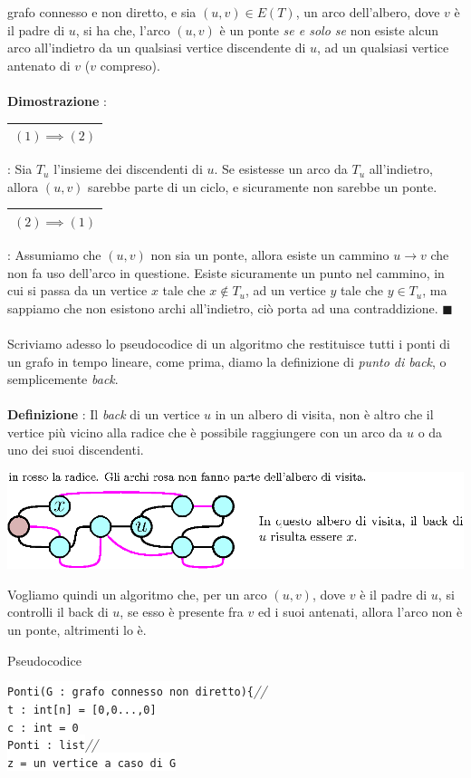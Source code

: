 \documentclass[12pt, letterpaper]{article}
\newcommand{\codee}[1]{\colorbox{white}{\texttt{#1}}}
\newcommand{\acc}{\\\hphantom{}\\}
\newcommand{\comm}[1]{\color{lg}\textit{\hphantom{spaz}// \text{#1}}\color{black}}
\newcommand{\boxedMath}[1]{\begin{tabular}{|c|}\hline \texttt{#1} \\ \hline\end{tabular} :}
\begin{document}
grafo connesso e non diretto, e sia $(u,v)\in E(T)$, un arco dell'albero, dove $v$ è il padre di $u$, si ha che,
l'arco  $(u,v)$ è un ponte \textit{se e solo se} non esiste alcun arco all'indietro da un qualsiasi vertice
discendente di $u$, ad un qualsiasi vertice antenato di $v$ ($v$ compreso).\acc
\textbf{Dimostrazione} : \boxedMath{$(1)\implies(2)$} Sia $T_u$ l'insieme dei discendenti di $u$. Se esistesse un arco da  $T_u$ all'indietro,
allora $(u,v)$ sarebbe parte di un ciclo, e sicuramente non sarebbe un ponte. \boxedMath{$(2)\implies(1)$} Assumiamo che
$(u,v)$ non sia un ponte, allora esiste un cammino $u\rightarrow v$ che non fa uso dell'arco in questione. Esiste sicuramente
un punto nel cammino, in cui si passa da un vertice $x$ tale che $x\notin T_u$, ad un vertice $y$ tale che
$y\in T_u$, ma sappiamo che non esistono archi all'indietro, ciò porta ad una contraddizione. $\blacksquare$\acc
Scriviamo adesso lo pseudocodice di un algoritmo che restituisce tutti i ponti di un grafo in tempo lineare, come prima, diamo
la definizione di \textit{punto di back}, o semplicemente \textit{back}.\acc
\textbf{Definizione} : Il \textit{back} di un vertice $u$ in un albero di visita, non è altro che il vertice più
vicino alla radice che è possibile raggiungere con un arco da $u$ o da uno dei suoi discendenti.\begin{center}
    \includegraphics[width=1\textwidth ]{images/back.eps}
\end{center}
Vogliamo quindi un algoritmo che, per un arco $(u,v)$, dove $v$ è il padre di $u$, si controlli il
back di $u$, se esso è presente fra $v$ ed i suoi antenati, allora l'arco non è un ponte, altrimenti lo è.
\begin{center}
    Pseudocodice
\end{center}
\codee{Ponti(G : grafo connesso non diretto)\{}\comm{funzione globale}\\
\hphantom{ident}\codee{t : int[n] = [0,0...,0]}\\
\hphantom{ident}\codee{c : int = 0}\\
\hphantom{ident}\codee{Ponti : list}\comm{l'output}\\
\hphantom{ident}\codee{z = un vertice a caso di G}\\
\end{document}
